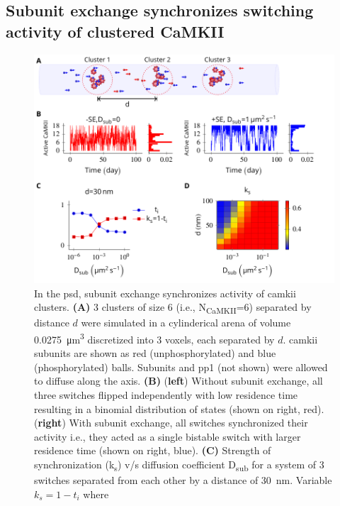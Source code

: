 \documentclass[9pt,lineno,doublespacing]{elife}
\newcommand\SUB[2]{#1\textsubscript{#2}}
\begin{document}

\subsection{Subunit exchange synchronizes switching activity of clustered CaMKII}
\label{subsec:se_sync_switches}

\begin{figure}%
    \includegraphics[width=0.9\linewidth]{./PaperFigures/elifeFigure5/figure_sync_150mm.pdf}
    \caption{In the \gls{psd}, subunit exchange synchronizes activity of
        \gls{camkii} clusters. \textbf{(A)} 3 clusters of size 6
        (i.e., \SUB{N}{CaMKII}=6) separated by distance \(d\) were simulated in 
        a cylinderical arena of volume \SI{0.0275}{\micro\meter^3} discretized into 3 voxels, each
        separated by \(d\). \Gls{camkii} subunits are shown as red
        (unphosphorylated) and blue (phosphorylated) balls. Subunits and \gls{pp1} (not shown) 
        were allowed to diffuse along
        the axis. \textbf{(B)} (\textbf{left}) Without subunit exchange, all three switches
        flipped independently with low residence time resulting in a binomial
        distribution of states (shown on right, red). (\textbf{right}) With subunit exchange, 
        all switches synchronized their activity i.e., they acted as a single
        bistable switch with larger residence time (shown on right, blue). \textbf{(C)}
        Strength of synchronization (\SUB{k}{s}) v/s diffusion
        coefficient \SUB{D}{sub} for a system of 3 switches separated from each
        other by a distance of \SI{30}{\nano \meter}. Variable $k_s=1-t_i$ where 
}
\end{figure}
\end{document}
